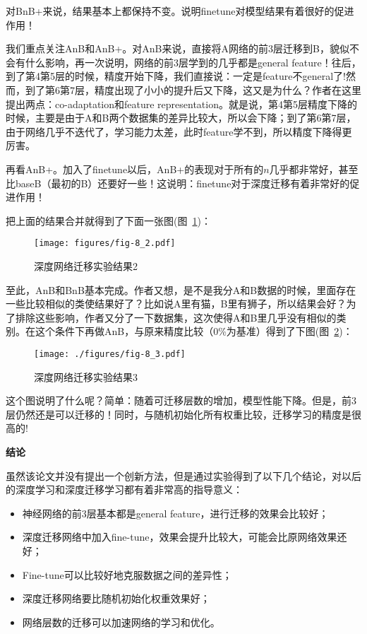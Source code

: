 对BnB+来说，结果基本上都保持不变。说明finetune对模型结果有着很好的促进作用！

我们重点关注AnB和AnB+。对AnB来说，直接将A网络的前3层迁移到B，貌似不会有什么影响，再一次说明，网络的前3层学到的几乎都是general feature！往后，到了第4第5层的时候，精度开始下降，我们直接说：一定是feature不general了!然而，到了第6第7层，精度出现了小小的提升后又下降，这又是为什么？作者在这里提出两点：co-adaptation和feature representation。就是说，第4第5层精度下降的时候，主要是由于A和B两个数据集的差异比较大，所以会下降；到了第6第7层，由于网络几乎不迭代了，学习能力太差，此时feature学不到，所以精度下降得更厉害。

再看AnB+。加入了finetune以后，AnB+的表现对于所有的$n$几乎都非常好，甚至比baseB（最初的B）还要好一些！这说明：finetune对于深度迁移有着非常好的促进作用！

把上面的结果合并就得到了下面一张图(图~\ref{fig-8-3})：

\begin{figure}[htbp]
	\centering
	\texttt{[image: figures/fig-8\_2.pdf]}
	\caption{深度网络迁移实验结果2}
	\label{fig-8-3}
\end{figure}

至此，AnB和BnB基本完成。作者又想，是不是我分A和B数据的时候，里面存在一些比较相似的类使结果好了？比如说A里有猫，B里有狮子，所以结果会好？为了排除这些影响，作者又分了一下数据集，这次使得A和B里几乎没有相似的类别。在这个条件下再做AnB，与原来精度比较（0\%为基准）得到了下图(图~\ref{fig-8-4})：

\begin{figure}[htbp]
	\centering
	\texttt{[image: ./figures/fig-8\_3.pdf]}
	\caption{深度网络迁移实验结果3}
	\label{fig-8-4}
\end{figure}

这个图说明了什么呢？简单：随着可迁移层数的增加，模型性能下降。但是，前3层仍然还是可以迁移的！同时，与随机初始化所有权重比较，迁移学习的精度是很高的!

\textbf{结论}

虽然该论文并没有提出一个创新方法，但是通过实验得到了以下几个结论，对以后的深度学习和深度迁移学习都有着非常高的指导意义：

\begin{itemize}
	\item 神经网络的前3层基本都是general feature，进行迁移的效果会比较好；
	\item 深度迁移网络中加入fine-tune，效果会提升比较大，可能会比原网络效果还好；
	\item Fine-tune可以比较好地克服数据之间的差异性；
	\item 深度迁移网络要比随机初始化权重效果好；
	\item 网络层数的迁移可以加速网络的学习和优化。
\end{itemize}

